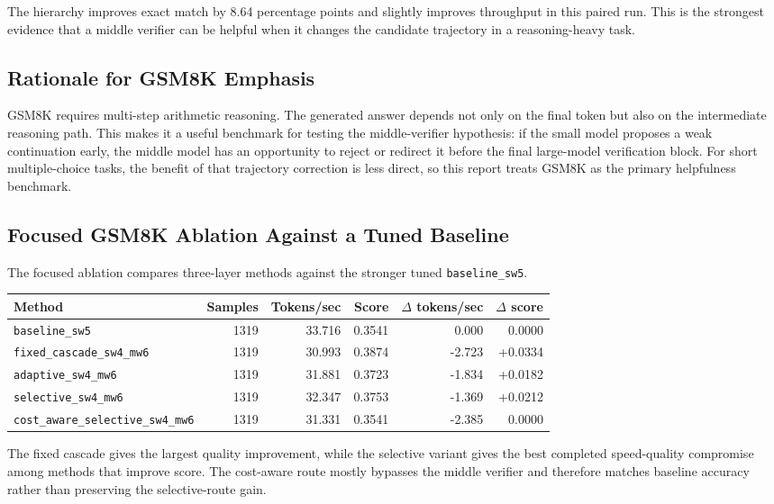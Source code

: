 \documentclass[11pt]{article}
\begin{document}
The hierarchy improves exact match by 8.64 percentage points and slightly improves throughput in this paired run. This is the strongest evidence that a middle verifier can be helpful when it changes the candidate trajectory in a reasoning-heavy task.

\subsection{Rationale for GSM8K Emphasis}

GSM8K requires multi-step arithmetic reasoning. The generated answer depends not only on the final token but also on the intermediate reasoning path. This makes it a useful benchmark for testing the middle-verifier hypothesis: if the small model proposes a weak continuation early, the middle model has an opportunity to reject or redirect it before the final large-model verification block. For short multiple-choice tasks, the benefit of that trajectory correction is less direct, so this report treats GSM8K as the primary helpfulness benchmark.

\subsection{Focused GSM8K Ablation Against a Tuned Baseline}

The focused ablation compares three-layer methods against the stronger tuned \texttt{baseline\_sw5}.

\begin{center}
\begin{tabular}{lrrrrr}
\toprule
Method & Samples & Tokens/sec & Score & $\Delta$ tokens/sec & $\Delta$ score \\
\midrule
\texttt{baseline\_sw5} & 1319 & 33.716 & 0.3541 & 0.000 & 0.0000 \\
\texttt{fixed\_cascade\_sw4\_mw6} & 1319 & 30.993 & 0.3874 & -2.723 & +0.0334 \\
\texttt{adaptive\_sw4\_mw6} & 1319 & 31.881 & 0.3723 & -1.834 & +0.0182 \\
\texttt{selective\_sw4\_mw6} & 1319 & 32.347 & 0.3753 & -1.369 & +0.0212 \\
\texttt{cost\_aware\_selective\_sw4\_mw6} & 1319 & 31.331 & 0.3541 & -2.385 & 0.0000 \\
\bottomrule
\end{tabular}
\end{center}

The fixed cascade gives the largest quality improvement, while the selective variant gives the best completed speed-quality compromise among methods that improve score. The cost-aware route mostly bypasses the middle verifier and therefore matches baseline accuracy rather than preserving the selective-route gain.
\end{document}
